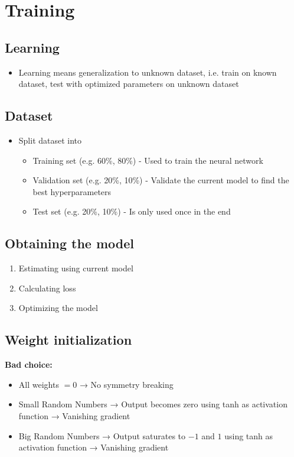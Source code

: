 \documentclass[10pt,a4paper]{article}
\begin{document}
\pagebreak

\section{Training}
\subsection{Learning}
\begin{itemize}
	\item Learning means generalization to unknown dataset, i.e. train on known dataset, test with optimized parameters on unknown dataset
\end{itemize}

\subsection{Dataset}
\begin{itemize}
	\item Split dataset into
	\begin{itemize}
		\item Training set (e.g. 60\%, 80\%) - Used to train the neural network
		\item Validation set (e.g. 20\%, 10\%) - Validate the current model to find the best hyperparameters
		\item Test set (e.g. 20\%, 10\%) - Is only used once in the end
	\end{itemize}
\end{itemize}

\subsection{Obtaining the model}
\begin{enumerate}
	\item Estimating using current model
	\item Calculating loss
	\item Optimizing the model
\end{enumerate}

\subsection{Weight initialization}
\textbf{Bad choice:}
\begin{itemize}
	\item All weights $= 0$ → No symmetry breaking
	\item Small Random Numbers → Output becomes zero using tanh as activation function → Vanishing gradient
	\item Big Random Numbers → Output saturates to $-1$ and $1$ using tanh as activation function → Vanishing gradient
\end{itemize}
\end{document}
